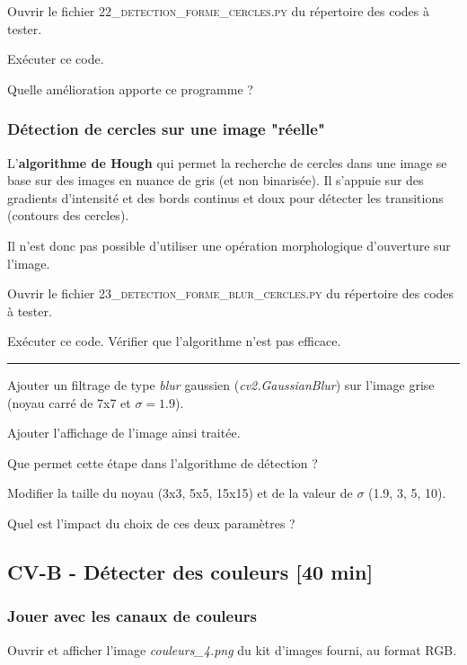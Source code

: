 \documentclass[a4paper,11pt,titlepage]{article} %
\begin{document}
\Manip Ouvrir le fichier \textsc{22\_detection\_forme\_cercles.py} du répertoire des codes à tester.

\Manip Exécuter ce code.

\Quest Quelle amélioration apporte ce programme ?

\subsubsection{Détection de cercles sur une image "réelle"}

L'\textbf{algorithme de Hough} qui permet la recherche de cercles dans une image se base sur des images en nuance de gris (et non binarisée). Il s'appuie sur des gradients d'intensité et des bords continus et doux pour détecter les transitions (contours des cercles).

Il n'est donc pas possible d'utiliser une opération morphologique d'ouverture sur l'image. 


\Manip Ouvrir le fichier \textsc{23\_detection\_forme\_blur\_cercles.py} du répertoire des codes à tester.

\Manip Exécuter ce code. Vérifier que l'algorithme n'est pas efficace.

\noindent \rule{\linewidth}{1pt}

\Manip Ajouter un filtrage de type \textit{blur} gaussien (\textit{cv2.GaussianBlur}) sur l'image grise (noyau carré de 7x7 et $\sigma = 1.9$).

\Manip Ajouter l'affichage de l'image ainsi traitée.

\Quest Que permet cette étape dans l'algorithme de détection ?

\Manip Modifier la taille du noyau (3x3, 5x5, 15x15) et de la valeur de $\sigma$ (1.9, 3, 5, 10).

\Quest Quel est l'impact du choix de ces deux paramètres ?



\subsection{CV-B - Détecter des couleurs {[40 min]}}

\subsubsection{Jouer avec les canaux de couleurs}

\Manip Ouvrir et afficher l'image \textsl{couleurs\_4.png} du kit d'images fourni, au format RGB.
\end{document}
